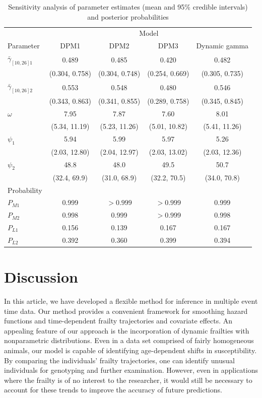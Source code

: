 \documentclass[10pt, letterpaper]{article}
\begin{document}
\begin{table}[htbp]
  \centering
  \caption{Sensitivity analysis of parameter estimates (mean and 95\% credible intervals) and posterior probabilities}
  \label{tab:sensitivity}
  \begin{tabular}{lcccc}
    \toprule
    & \multicolumn{4}{c}{Model} \\
    \cmidrule(lr){2-5}
    Parameter & DPM1 & DPM2 & DPM3 & Dynamic gamma \\
    \midrule
    $\bar{\gamma}_{[10,26]1}$ & 0.489 & 0.485 & 0.420 & 0.482 \\
              & (0.304, 0.758) & (0.304, 0.748) & (0.254, 0.669) & (0.305, 0.735) \\
    $\bar{\gamma}_{[10,26]2}$ & 0.553 & 0.548 & 0.480 & 0.546 \\
              & (0.343, 0.863) & (0.341, 0.855) & (0.289, 0.758) & (0.345, 0.845) \\
    $\omega$    & 7.95 & 7.87 & 7.60 & 8.01 \\
              & (5.34, 11.19) & (5.23, 11.26) & (5.01, 10.82) & (5.41, 11.26) \\
    $\psi_1$    & 5.94 & 5.99 & 5.97 & 5.26 \\
              & (2.03, 12.80) & (2.04, 12.97) & (2.03, 13.02) & (2.03, 12.36) \\
    $\psi_2$    & 48.8 & 48.0 & 49.5 & 50.7 \\
              & (32.4, 69.9) & (31.0, 68.9) & (32.2, 70.5) & (34.0, 70.8) \\
    \midrule
    \multicolumn{1}{l}{Probability} \\
    $P_{M1}$    & 0.999 & $>0.999$ & $>0.999$ & 0.999 \\
    $P_{M2}$    & 0.998 & 0.999 & $>0.999$ & 0.998 \\
    $P_{L1}$    & 0.156 & 0.139 & 0.167 & 0.167 \\
    $P_{L2}$    & 0.392 & 0.360 & 0.399 & 0.394 \\
    \bottomrule
  \end{tabular}
\end{table}


\section{Discussion}

In this article, we have developed a flexible method for inference in multiple event time data. Our method provides a convenient framework for smoothing hazard functions and time-dependent frailty trajectories and covariate effects. An appealing feature of our approach is the incorporation of dynamic frailties with nonparametric distributions. Even in a data set comprised of fairly homogeneous animals, our model is capable of identifying age-dependent shifts in susceptibility. By comparing the individuals' frailty trajectories, one can identify unusual individuals for genotyping and further examination. However, even in applications where the frailty is of no interest to the researcher, it would still be necessary to account for these trends to improve the accuracy of future predictions.
\end{document}
